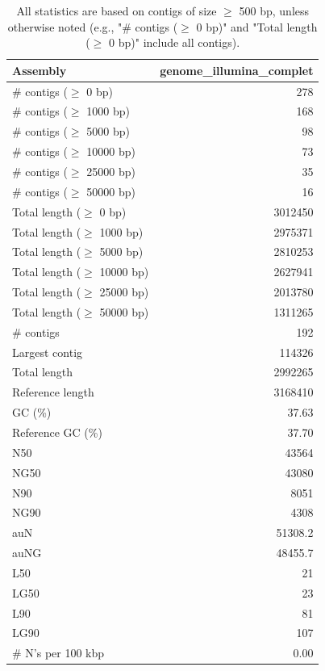\documentclass[12pt,a4paper]{article}
\begin{document}
\begin{table}[ht]
\begin{center}
\caption{All statistics are based on contigs of size $\geq$ 500 bp, unless otherwise noted (e.g., "\# contigs ($\geq$ 0 bp)" and "Total length ($\geq$ 0 bp)" include all contigs).}
\begin{tabular}{|l*{1}{|r}|}
\hline
Assembly & genome\_illumina\_complet \\ \hline
\# contigs ($\geq$ 0 bp) & 278 \\ \hline
\# contigs ($\geq$ 1000 bp) & 168 \\ \hline
\# contigs ($\geq$ 5000 bp) & 98 \\ \hline
\# contigs ($\geq$ 10000 bp) & 73 \\ \hline
\# contigs ($\geq$ 25000 bp) & 35 \\ \hline
\# contigs ($\geq$ 50000 bp) & 16 \\ \hline
Total length ($\geq$ 0 bp) & 3012450 \\ \hline
Total length ($\geq$ 1000 bp) & 2975371 \\ \hline
Total length ($\geq$ 5000 bp) & 2810253 \\ \hline
Total length ($\geq$ 10000 bp) & 2627941 \\ \hline
Total length ($\geq$ 25000 bp) & 2013780 \\ \hline
Total length ($\geq$ 50000 bp) & 1311265 \\ \hline
\# contigs & 192 \\ \hline
Largest contig & 114326 \\ \hline
Total length & 2992265 \\ \hline
Reference length & 3168410 \\ \hline
GC (\%) & 37.63 \\ \hline
Reference GC (\%) & 37.70 \\ \hline
N50 & 43564 \\ \hline
NG50 & 43080 \\ \hline
N90 & 8051 \\ \hline
NG90 & 4308 \\ \hline
auN & 51308.2 \\ \hline
auNG & 48455.7 \\ \hline
L50 & 21 \\ \hline
LG50 & 23 \\ \hline
L90 & 81 \\ \hline
LG90 & 107 \\ \hline
\# N's per 100 kbp & 0.00 \\ \hline
\end{tabular}
\end{center}
\end{table}
\end{document}
